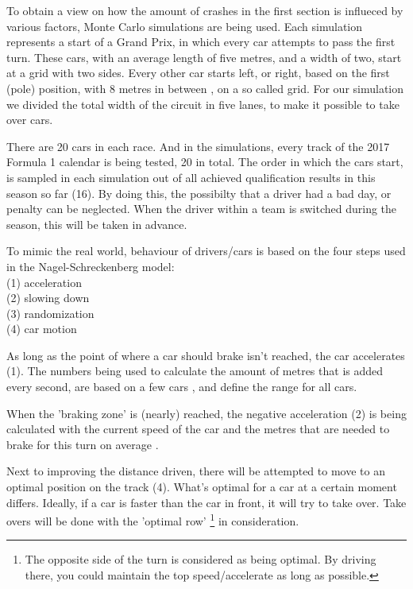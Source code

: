 To obtain a view on how the amount of crashes in the first section is influeced by various factors, Monte Carlo simulations are being used. Each simulation represents a start of a Grand Prix, in which every car attempts to pass the first turn. These cars, with an average length of five metres, and a width of two, start at a grid with two sides. Every other car starts left, or right, based on the first (pole) position, with 8 metres in between \cite{car-regulations}, on a so called grid. For our simulation we divided the total width of the circuit in five lanes, to make it possible to take over cars.

There are 20 cars in each race. And in the simulations, every track of the 2017 Formula 1 calendar is being tested, 20 in total. The order in which the cars start, is sampled in each simulation out of all achieved qualification results in this season so far (16). By doing this, the possibilty that a driver had a bad day, or penalty can be neglected. When the driver within a team is switched during the season, this will be taken in advance.

To mimic the real world, behaviour of drivers/cars is based on the four steps used in the Nagel-Schreckenberg model:\\

\noindent
(1) acceleration\\
(2) slowing down\\
(3) randomization\\
(4) car motion

\medskip
As long as the point of where a car should brake isn't reached, the car accelerates (1). The numbers being used to calculate the amount of metres that is added every second, are based on a few cars \cite{som}, and define the range for all cars.

When the 'braking zone' is (nearly) reached, the negative acceleration (2) is being calculated with the current speed of the car and the metres that are needed to brake for this turn on average \cite{som}.

Next to improving the distance driven, there will be attempted to move to an optimal position on the track (4). What's optimal for a car at a certain moment differs. Ideally, if a car is faster than the car in front, it will try to take over. Take overs will be done with the 'optimal row' \footnote{The opposite side of the turn is considered as being optimal. By driving there, you could maintain the top speed/accelerate as long as possible.} in consideration.


